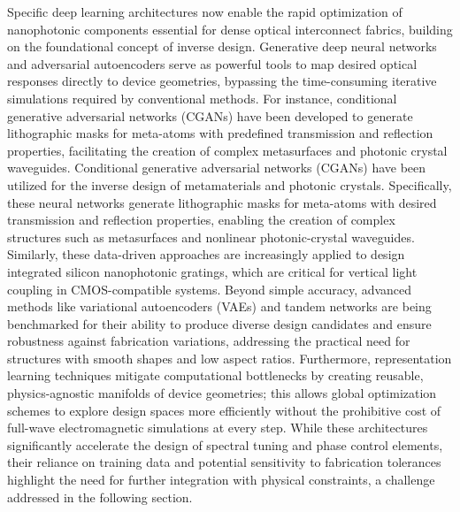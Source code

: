 Specific deep learning architectures now enable the rapid optimization of nanophotonic components essential for dense optical interconnect fabrics, building on the foundational concept of inverse design. Generative deep neural networks and adversarial autoencoders serve as powerful tools to map desired optical responses directly to device geometries, bypassing the time-consuming iterative simulations required by conventional methods. For instance, conditional generative adversarial networks (CGANs) have been developed to generate lithographic masks for meta-atoms with predefined transmission and reflection properties, facilitating the creation of complex metasurfaces and photonic crystal waveguides. Conditional generative adversarial networks (CGANs) have been utilized for the inverse design of metamaterials and photonic crystals. Specifically, these neural networks generate lithographic masks for meta-atoms with desired transmission and reflection properties, enabling the creation of complex structures such as metasurfaces and nonlinear photonic-crystal waveguides. \citep{doi_10_1109_metamaterials62190_2024_10703328_b89eaef7} Similarly, these data-driven approaches are increasingly applied to design integrated silicon nanophotonic gratings, which are critical for vertical light coupling in CMOS-compatible systems. Beyond simple accuracy, advanced methods like variational autoencoders (VAEs) and tandem networks are being benchmarked for their ability to produce diverse design candidates and ensure robustness against fabrication variations, addressing the practical need for structures with smooth shapes and low aspect ratios. Furthermore, representation learning techniques mitigate computational bottlenecks by creating reusable, physics-agnostic manifolds of device geometries; this allows global optimization schemes to explore design spaces more efficiently without the prohibitive cost of full-wave electromagnetic simulations at every step. While these architectures significantly accelerate the design of spectral tuning and phase control elements, their reliance on training data and potential sensitivity to fabrication tolerances highlight the need for further integration with physical constraints, a challenge addressed in the following section. \citep{doi_10_1109_metamaterials62190_2024_10703328_b89eaef7} \citep{doi_10_1109_cleo_europe_eqec52157_2021_9542763_c5b6331c} \citep{doi_10_29026_oes_2022_210012_27973a69} \citep{doi_10_1002_adom_202502062_d73a85e1}


